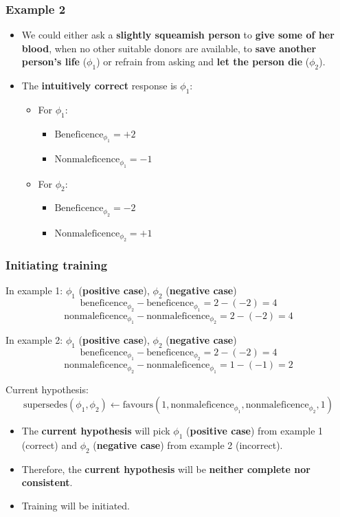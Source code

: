 \documentclass[11pt]{article}
\begin{document}
\subsubsection{Example 2}
\label{sec:org885eb0f}
\begin{itemize}
\item We could either ask a \textbf{slightly squeamish person} to \textbf{give some of her blood}, when no other suitable donors are available, to \textbf{save another person's life} (\(\phi_1\)) or refrain from asking and \textbf{let the person die} (\(\phi_2\)).
\item The \textbf{intuitively correct} response is \(\phi_1\):
\begin{itemize}
\item For \(\phi_1\):
\begin{itemize}
\item \(\text{Beneficence}_{\phi_1} = + 2\)
\item \(\text{Nonmaleficence}_{\phi_1} = - 1\)
\end{itemize}
\item For \(\phi_2\):
\begin{itemize}
\item \(\text{Beneficence}_{\phi_2} = - 2\)
\item \(\text{Nonmaleficence}_{\phi_2} = + 1\)
\end{itemize}
\end{itemize}
\end{itemize}
\subsubsection{Initiating training}
\label{sec:orge953937}
In example 1:
\(\phi_1\) (\textbf{positive case}), \(\phi_2\) (\textbf{negative case})
\[\text{beneficence}_{\phi_2} - \text{beneficence}_{\phi_1} = 2 - (-2) = 4\]
\[\text{nonmaleficence}_{\phi_1} - \text{nonmaleficence}_{\phi_2} = 2 - (-2) = 4\]

In example 2:
\(\phi_1\) (\textbf{positive case}), \(\phi_2\) (\textbf{negative case})
\[\text{beneficence}_{\phi_1} - \text{beneficence}_{\phi_2} = 2 - (-2) = 4\]
\[\text{nonmaleficence}_{\phi_2} - \text{nonmaleficence}_{\phi_1} = 1 - (-1) = 2\]

Current hypothesis:
\[\text{supersedes}(\phi_1, \phi_2) \leftarrow \text{favours}(1, \text{nonmaleficence}_{\phi_1}, \text{nonmaleficence}_{\phi_2}, 1)\]
\begin{itemize}
\item The \textbf{current hypothesis} will pick \(\phi_1\) (\textbf{positive case}) from example 1 (correct) and \(\phi_2\) (\textbf{negative case}) from example 2 (incorrect).
\item Therefore, the \textbf{current hypothesis} will be \textbf{neither complete nor consistent}.
\item Training will be initiated.
\end{itemize}
\end{document}
